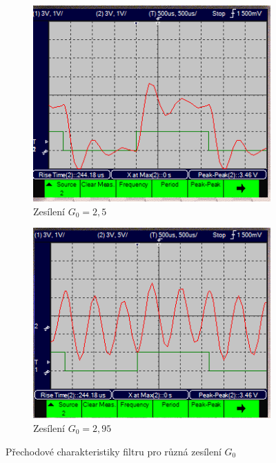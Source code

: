 \documentclass[twoside]{article}
\begin{document}
\begin{figure}[h!]
    \begin{subfigure}{0.48\textwidth}
        \centering
        \includegraphics[width=1\linewidth]{step_15k.png}
        \caption{Zesílení $G_0 = 2,5$}
        \label{fig:step_15k}
    \end{subfigure}
    \begin{subfigure}{0.48\textwidth}
        \centering
        \includegraphics[width=1\linewidth]{step_19k5.png}
        \caption{Zesílení $G_0 = 2,95$}
        \label{fig:step_19k}
    \end{subfigure}

    \caption{Přechodové charakteristiky filtru pro různá zesílení $G_0$}
    \label{fig:step}
\end{figure}
\end{document}
